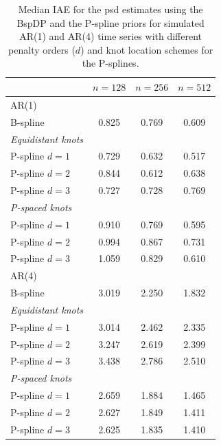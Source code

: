 \documentclass[twocolumn,final]{svjour3}
\begin{document}
\def\arraystretch{1.1}
\begin{table}
	\centering
		\begin{tabular}{lccc}
			\toprule
			& $n=128$ & $n=256$ & $n=512$ \\ \hline
			AR(1)     &  &  &  \\ 
			B-spline &  0.825 & 0.769 & 0.609  \\
			\textit{Equidistant knots}& & &   \\
			\hspace{0.5em}P-spline $d=1$ &  0.729 & 0.632 & 0.517  \\
			\hspace{0.5em}P-spline $d=2$&  0.844 & 0.612 & 0.638  \\
			\hspace{0.5em}P-spline $d=3$&  0.727 & 0.728 & 0.769  \\
			\textit{P-spaced knots}& & &   \\
			\hspace{0.5em}P-spline $d=1$ & 0.910 & 0.769 & 0.595 \\
			\hspace{0.5em}P-spline $d=2$ & 0.994 & 0.867 & 0.731 \\
			\hspace{0.5em}P-spline $d=3$ & 1.059 & 0.829 & 0.610 \\ \hline
			AR(4)     &  &  &  \\ 
			B-spline & 3.019 & 2.250 & 1.832   \\
			\textit{Equidistant knots}& & &   \\
			\hspace{0.5em}P-spline $d=1$ & 3.014 & 2.462 & 2.335  \\
			\hspace{0.5em}P-spline $d=2$& 3.247 & 2.619 & 2.399 \\
			\hspace{0.5em}P-spline $d=3$& 3.438 & 2.786 & 2.510  \\	
			\textit{P-spaced knots}& & &   \\
			\hspace{0.5em}P-spline $d=1$ & 2.659 & 1.884 & 1.465 \\
			\hspace{0.5em}P-spline $d=2$ & 2.627 & 1.849 & 1.411 \\
			\hspace{0.5em}P-spline $d=3$ & 2.625 & 1.835 & 1.410 \\
			\bottomrule
		\end{tabular}
	\caption{Median IAE for the psd estimates using the BspDP and the P-spline priors for simulated AR(1) and AR(4) time series with  different penalty orders ($d$) and knot location schemes for the P-splines.}
	\label{table:sim_IAE}
\end{table}
\end{document}
